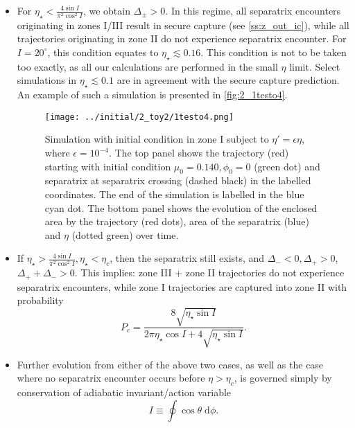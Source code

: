 \documentclass[
        fleqn,
        usenatbib,
    ]{mnras}
\begin{document}
\begin{itemize}
    \item For $\eta_\star < \frac{4\sin I}{\pi^2 \cos^2 I}$, we obtain
        $\Delta_{\pm} > 0$. In this regime, all separatrix encounters
        originating in zones I/III result in secure capture (see
        \autoref{ss:z_out_ic}), while all trajectories originating in zone II do
        not experience separatrix encounter. For $I = 20^\circ$, this condition
        equates to $\eta_\star \lesssim 0.16$. This condition is not to be taken
        too exactly, as all our calculations are performed in the small $\eta$
        limit. Select simulations in $\eta_\star \lesssim 0.1$ are in agreement
        with the secure capture prediction. An example of such a simulation is
        presented in \autoref{fig:2_1testo4}.
        \begin{figure}[t]
            \centering
            \texttt{[image: ../initial/2\_toy2/1testo4.png]}
            \caption{Simulation with initial condition in zone I subject to
            $\eta' = \epsilon \eta$, where $\epsilon = 10^{-4}$. The top panel
            shows the trajectory (red) starting with initial condition $\mu_0 =
            0.140, \phi_0 = 0$ (green dot) and separatrix at separatrix crossing
            (dashed black) in the labelled coordinates. The end of the
            simulation is labelled in the blue cyan dot. The bottom panel shows
            the evolution of the enclosed area by the trajectory (red dots),
            area of the separatrix (blue) and $\eta$ (dotted green) over
            time.}\label{fig:2_1testo4}
        \end{figure}

    \item If $\eta_\star > \frac{4\sin I}{\pi^2 \cos^2 I}, \eta_\star < \eta_c$,
        then the separatrix still exists, and $\Delta_- < 0, \Delta_+ > 0$,
        $\Delta_+ + \Delta_- > 0$. This implies: zone III + zone II trajectories
        do not experience separatrix encounters, while zone I trajectories are
        captured into zone II with probability
        \begin{equation}
            P_c = \frac{8\sqrt{\eta_\star \sin I}}{2\pi \eta_\star \cos I +
                4\sqrt{\eta_\star \sin I}}.
        \end{equation}

    \item Further evolution from either of the above two cases, as well as the
        case where no separatrix encounter occurs before $\eta > \eta_c$, is
        governed simply by conservation of adiabatic invariant/action variable
        \begin{equation}
            I \equiv \oint \cos \theta \;\mathrm{d}\phi.
        \end{equation}
\end{itemize}
\end{document}
